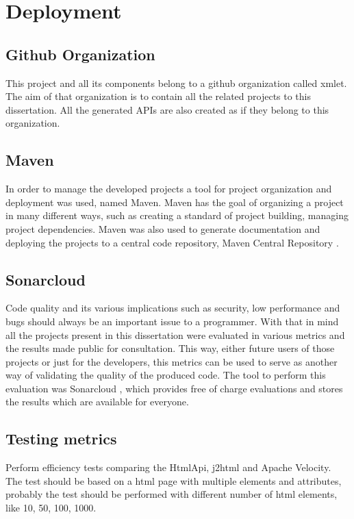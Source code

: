 \chapter{Deployment}
\label{cha:deployment}

\section{Github Organization} %
\label{sec:github}


This project and all its components belong to a github organization called xmlet. The aim of that organization is to contain all the related projects to this dissertation. All the generated APIs are also created as if they belong to this organization. 

\section{Maven} %
\label{sec:maven}

In order to manage the developed projects a tool for project organization and deployment was used, named Maven. Maven has the goal of organizing a project in many different ways, such as creating a standard of project building, managing project dependencies. Maven was also used to generate documentation and deploying the projects to a central code repository, Maven Central Repository
.

\section{Sonarcloud} %
\label{sec:sonarcloud}

Code quality and its various implications such as security, low performance and bugs should always be an important issue to a programmer. With that in mind all the projects present in this dissertation were evaluated in various metrics and the results made public for consultation. This way, either future users of those projects or just for the developers, this metrics can be used to serve as another way of validating the quality of the produced code. The tool to perform this evaluation was Sonarcloud
, which provides free of charge evaluations and stores the results which are available for everyone.

\section{Testing metrics} %
\label{sec:testingmetrics}

Perform efficiency tests comparing the HtmlApi, j2html and Apache Velocity. The test should be based on a html page with multiple elements and attributes, probably the test should be performed with different number of html elements, like 10, 50, 100, 1000.